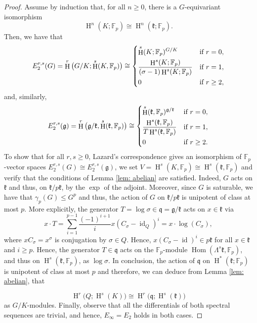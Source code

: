 \documentclass[11pt]{article}
\newcommand{\F}{\mathbb{F}}
\newcommand{\Fp}{\mathbb{F}_p}
\newcommand{\g}{\mathfrak{g}}
\newcommand{\kk}{\mathfrak{k}}
\newcommand{\q}{\mathfrak{q}}
\DeclareMathOperator{\id}{id}
\DeclareMathOperator{\Hom}{Hom}
\DeclareMathOperator{\HH}{H}
\newcommand{\isom}{\cong}
\theoremstyle{plain}
\theoremstyle{definition}
\begin{document}
	\begin{proof}
	
	Assume by induction that, for all $n\geq 0$, there is a $G$-equivariant isomorphism $$\HH^n(K;\Fp)\isom\HH^n(\kk;\Fp).$$
	Then, we have that 
	\begin{displaymath}
		E_2^{r,s}(G)=\HH^r\big(G/K;\HH^s(K,\Fp)\big)\isom \begin{dcases}
			\HH^s(K;\Fp)^{G/K} & \text{if } r=0, \\
			\frac{\HH^s(K;\Fp)}{(\sigma-1)\HH^s(K;\Fp)} & \text{if } r=1, \\
			0 & \text{if } r\geq 2, \\
		\end{dcases}
	\end{displaymath}
	and, similarly,
	\begin{displaymath}
		E_2^{r,s}(\g)=\HH^r\big(\g/\kk,\HH^s(\kk,\Fp)\big)\isom \begin{dcases}
			\HH^s(\kk,\Fp)^{\g/\kk} & \text{if } r=0, \\
			\frac{\HH^s(\kk,\Fp)}{T\HH^s(\kk,\Fp)} & \text{if } r=1, \\
			0 & \text{if } r\geq 2. \\
		\end{dcases}
	\end{displaymath}
To show that for all $r,s\geq 0$, Lazard's correspondence gives an isomorphism of $\F_p$-vector spaces $E^{r,s}_2(G)\cong E^{r,s}_2(\g)$, we set $V=\HH^s(K,\Fp)\isom \HH^s(\kk,\Fp)$ and verify that the conditions of Lemma \ref{lem: abelian} are satisfied. Indeed, $G$ acts on $\kk$ and thus, on $\kk/p\kk$, by the $\exp$ of the adjoint. Moreover, since $G$ is saturable, we have that $\gamma_p(G)\leq G^p$ and  thus, the action of $G$ on $\kk/p\kk$ is unipotent of class at most $p$. More explicitly, the generator $T=\log \sigma\in \q=\g/\kk$ acts on $x\in \kk$ via
	\begin{displaymath}
		x\cdot T=\sum_{i=1}^{p-1}\frac{(-1)^{i+1}}{i}x(C_\sigma-\id_Q)^i =x\cdot\log(C_{\sigma}),
	\end{displaymath}
	where $xC_\sigma=x^\sigma$ is conjugation by $\sigma\in Q$. Hence, $x(C_\sigma-\id)^i\in p\kk$ for all $x\in \kk$ and $i\geq p$. Hence, the generator $T\in\q$ acts on the $\Fp$-module $\Hom(\Lambda^s \kk,\Fp)$, and thus on $\HH^s(\kk,\Fp)$, as $\log \sigma$. In conclusion, the action of $\q$ on $\HH^*(\kk;\F_p)$ is unipotent of class at most $p$ and therefore, we can deduce from Lemma \ref{lem: abelian}, that
	
	\begin{displaymath}
		\HH^r\big(Q;\HH^s(K)\big) \isom \HH^r\big(\q;\HH^s(\kk)\big)
	\end{displaymath}
	as $G/K$-modules. Finally, observe that all the differentials of both spectral sequences are trivial, and hence, $E_{\infty}=E_2$ holds in both cases.
	\end{proof}
	
\end{document}
